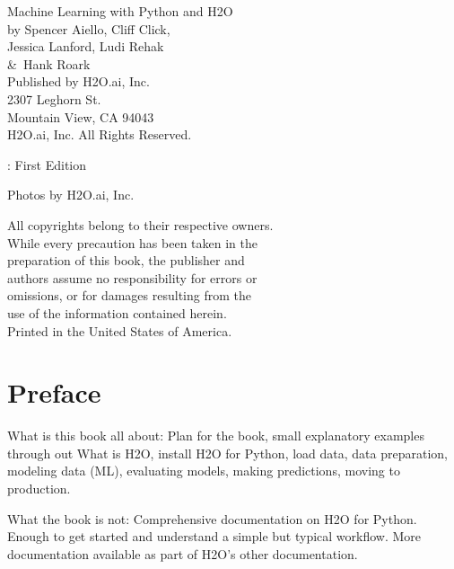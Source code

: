 {\raggedright 

Machine Learning with Python and H2O\\
  by Spencer Aiello, Cliff Click, \\ 
Jessica Lanford, Ludi Rehak \\
\&\  Hank Roark\\
\bigskip
  Published by H2O.ai, Inc. \\
2307 Leghorn St. \\
Mountain View, CA 94043\\
\bigskip
\textcopyright \the\year \hspace{1pt} H2O.ai, Inc. All Rights Reserved. 
\bigskip

\monthname \hspace{1pt}  \the\year: First Edition 
\bigskip

Photos by \textcopyright H2O.ai, Inc.
\bigskip

All copyrights belong to their respective owners.\\
While every precaution has been taken in the\\
preparation of this book, the publisher and\\
authors assume no responsibility for errors or\\
omissions, or for damages resulting from the\\
use of the information contained herein.\\
\bigskip
Printed in the United States of America. 
}


\newpage
\thispagestyle{empty}%

\tableofcontents
\thispagestyle{empty}%

\newpage

\section{Preface}
What is this book all about:
Plan for the book, small explanatory examples through out
What is H2O, install H2O for Python, load data, data preparation,
modeling data (ML), evaluating models, making predictions, moving to production.

What the book is not:
Comprehensive documentation on H2O for Python.  Enough to get started and understand
a simple but typical workflow.  More documentation available as part of H2O's
other documentation.




